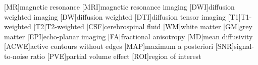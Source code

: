 [MR]{magnetic resonance}
[MRI]{magnetic resonance imaging}
[DWI]{diffusion weighted imaging}
[DW]{diffusion weighted}
[DTI]{diffusion tensor imaging}
[T1]{T1-weighted}
[T2]{T2-weighted}
[CSF]{cerebrospinal fluid}
[WM]{white matter}
[GM]{grey matter}
[EPI]{echo-planar imaging}
[FA]{fractional anisotropy}
[MD]{mean diffusivity}
[ACWE]{active contours without edges}
[MAP]{maximum a posteriori}
[SNR]{signal-to-noise ratio}
[PVE]{partial volume effect}
[ROI]{region of interest}